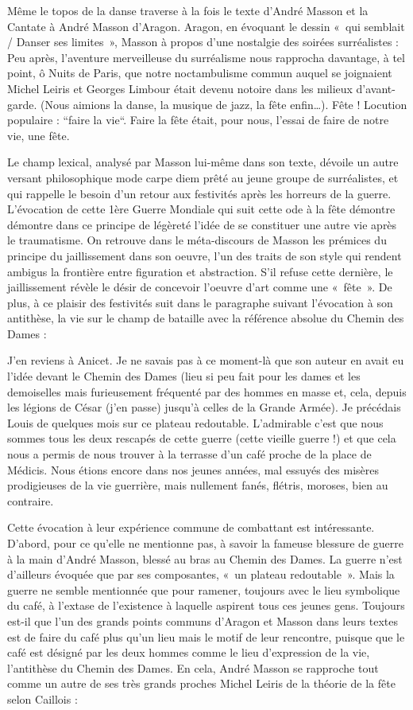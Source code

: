 	Même le topos de la danse traverse à la fois le texte d’André Masson et la Cantate à André Masson d’Aragon. Aragon, en évoquant le dessin « qui semblait / Danser ses limites », Masson à propos d’une nostalgie des soirées surréalistes : 
 Peu après, l’aventure merveilleuse du surréalisme nous rapprocha davantage, à tel point, ô Nuits de Paris, que notre noctambulisme commun auquel se joignaient Michel Leiris et Georges Limbour était devenu notoire dans les milieux d’avant-garde. (Nous aimions la danse, la musique de jazz, la fête enfin…). Fête ! Locution populaire : “faire la vie“. Faire la fête était, pour nous, l’essai de faire de notre vie, une fête. 

	Le champ lexical, analysé par Masson lui-même dans son texte, dévoile un autre versant philosophique mode carpe diem prêté au jeune groupe de surréalistes, et qui rappelle le besoin d’un retour aux festivités après les horreurs de la guerre. L’évocation de cette 1ère Guerre Mondiale qui suit cette ode à la fête démontre démontre dans ce principe de légèreté l’idée de se constituer une autre vie après le traumatisme. On retrouve dans le méta-discours de Masson les prémices du principe du jaillissement dans son oeuvre, l’un des traits de son style qui rendent ambigus la frontière entre figuration et abstraction. S’il refuse cette dernière, le jaillissement révèle le désir de concevoir l’oeuvre d’art comme une « fête ». De plus, à ce plaisir des festivités suit dans le paragraphe suivant l’évocation à son antithèse, la vie sur le champ de bataille avec la référence absolue du Chemin des Dames : 

J’en reviens à Anicet. Je ne savais pas à ce moment-là que son auteur en avait eu l’idée devant le Chemin des Dames (lieu si peu fait pour les dames et les demoiselles mais furieusement fréquenté par des hommes en masse et, cela, depuis les légions de César (j’en passe) jusqu’à celles de la Grande Armée). Je précédais Louis de quelques mois sur ce plateau redoutable. L’admirable c’est que nous sommes tous les deux rescapés de cette guerre (cette vieille guerre !) et que cela nous a permis de nous trouver à la terrasse d’un café proche de la place de Médicis. Nous étions encore dans nos jeunes années, mal essuyés des misères prodigieuses de la vie guerrière, mais nullement fanés, flétris, moroses, bien au contraire. 

	Cette évocation à leur expérience commune de combattant est intéressante. D’abord, pour ce qu’elle ne mentionne pas, à savoir la fameuse blessure de guerre à la main d’André Masson, blessé au bras au Chemin des Dames. La guerre n’est d’ailleurs évoquée que par ses composantes, « un plateau redoutable ». Mais la guerre ne semble mentionnée que pour ramener, toujours avec le lieu symbolique du café, à l’extase de l’existence à laquelle aspirent tous ces jeunes gens. Toujours est-il que l’un des grands points communs d’Aragon et Masson dans leurs textes est de faire du café plus qu’un lieu mais le motif de leur rencontre, puisque que le café est désigné par les deux hommes comme le lieu d’expression de la vie, l’antithèse du Chemin des Dames. En cela, André Masson se rapproche tout comme un autre de ses très grands proches Michel Leiris de la théorie de la fête selon Caillois :

